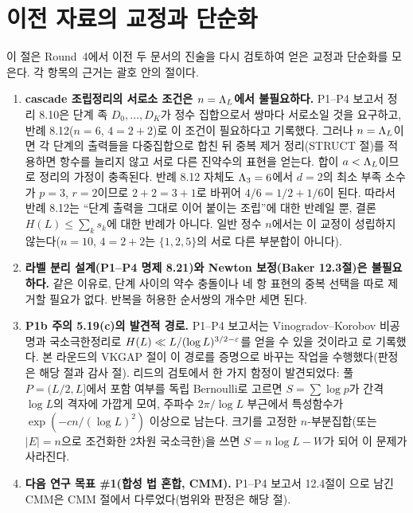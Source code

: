 \section{이전 자료의 교정과 단순화}\label{LEAD:corrections}
이 절은 Round~4에서 이전 두 문서의 진술을 다시 검토하여 얻은 교정과 단순화를 모은다. 각 항목의 근거는 괄호 안의 절이다.

\begin{enumerate}[leftmargin=1.6em, itemsep=4pt]
\item \textbf{cascade 조립정리의 서로소 조건은 $n=\Lambda_L$에서 불필요하다.} \PROVED{}
P1--P4 보고서 정리 8.10은 단계 족 $D_0,\dots,D_K$가 정수 집합으로서 쌍마다 서로소일 것을 요구하고, 반례 8.12($n=6$, $4=2+2$)로 이 조건이 필요하다고 기록했다. 그러나 $n=\Lambda_L$이면 각 단계의 출력들을 다중집합으로 합친 뒤 중복 제거 정리(STRUCT 절)를 적용하면 항수를 늘리지 않고 서로 다른 진약수의 표현을 얻는다. 합이 $a<\Lambda_L$이므로 정리의 가정이 충족된다. 반례 8.12 자체도 $\Lambda_3=6$에서 $d=2$의 최소 부족 소수가 $p=3$, $r=2$이므로 $2+2=3+1$로 바뀌어 $4/6=1/2+1/6$이 된다. 따라서 반례 8.12는 ``단계 출력을 그대로 이어 붙이는 조립''에 대한 반례일 뿐, 결론 $H(L)\le\sum_k s_k$에 대한 반례가 아니다. 일반 정수 $n$에서는 이 교정이 성립하지 않는다($n=10$, $4=2+2$는 $\{1,2,5\}$의 서로 다른 부분합이 아니다).
\item \textbf{라벨 분리 설계(P1--P4 명제 8.21)와 Newton 보정(Baker 12.3절)은 불필요하다.} \PROVED{} 같은 이유로, 단계 사이의 약수 충돌이나 네 항 표현의 중복 선택을 따로 제거할 필요가 없다. 반복을 허용한 순서쌍의 개수만 세면 된다.
\item \textbf{P1b 주의 5.19(c)의 발견적 경로.} P1--P4 보고서는 Vinogradov--Korobov 비공명과 국소극한정리로 $H(L)\ll L/(\log L)^{3/2-\varepsilon}$를 얻을 수 있을 것이라고 \HEUR{}로 기록했다. 본 라운드의 VKGAP 절이 이 경로를 증명으로 바꾸는 작업을 수행했다(판정은 해당 절과 감사 절). 리드의 검토에서 한 가지 함정이 발견되었다: 풀 $P=(L/2,L]$에서 포함 여부를 독립 Bernoulli로 고르면 $S=\sum\log p$가 간격 $\log L$의 격자에 가깝게 모여, 주파수 $2\pi/\log L$ 부근에서 특성함수가 $\exp(-cn/(\log L)^2)$ 이상으로 남는다. 크기를 고정한 $n$-부분집합(또는 $|E|=n$으로 조건화한 2차원 국소극한)을 쓰면 $S=n\log L-W$가 되어 이 문제가 사라진다.
\item \textbf{다음 연구 목표 \#1(합성 법 혼합, CMM).} P1--P4 보고서 12.4절이 \OPEN{}으로 남긴 CMM은 CMM 절에서 다루었다(범위와 판정은 해당 절).
\end{enumerate}
